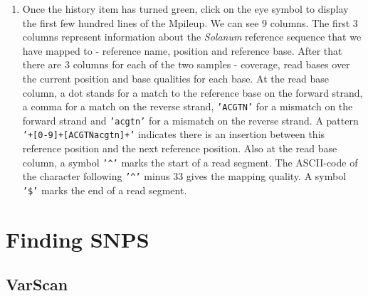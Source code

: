 \documentclass[12pt,a4paper]{article}
\begin{document}
\begin{enumerate}
	\item Once the history item has turned green, click on the eye
          symbol to display the first few hundred lines of the
          Mpileup. We can see 9 columns. The first 3 columns represent
          information about the \emph{Solanum} reference sequence that
          we have mapped to - reference name, position and reference
          base. After that there are 3 columns for each of the two
          samples - coverage, read bases over the current position and
          base qualities for each base. At the read base column, a dot
          stands for a match to the reference base on the forward
          strand, a comma for a match on the reverse strand,
          \texttt{'ACGTN'} for a mismatch on the forward strand and
          \texttt{'acgtn'} for a mismatch on the reverse strand. A
          pattern \texttt{'+[0-9]+[ACGTNacgtn]+'} indicates there is
          an insertion between this reference position and the next
          reference position. Also at the read base column, a symbol
          \texttt{'\textasciicircum'} marks the start of a read
          segment. The ASCII-code of the character following
          \texttt{'\textasciicircum'} minus 33 gives the mapping
          quality. A symbol \texttt{'\$'} marks the end of a read
          segment.
\end{enumerate}

\section{Finding SNPS}

\subsection{VarScan}
\end{document}
